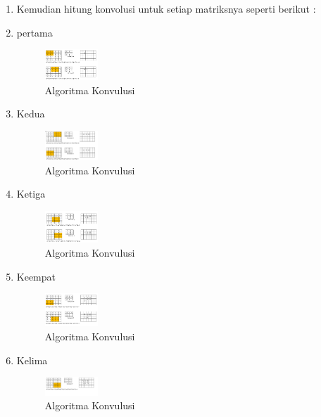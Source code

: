\begin{enumerate}
	\item Kemudian hitung konvolusi untuk setiap matriksnya seperti berikut :
	
	\item pertama
		\begin{figure}[ht]
			\centering
			\includegraphics[width=2cm]{figures/1174008/7/teori8.PNG}
			\caption{Algoritma Konvulusi}
			\label{Teori}
		\end{figure}

	\item Kedua
		\begin{figure}[ht]
			\centering
			\includegraphics[width=2cm]{figures/1174008/7/teori9.PNG}
			\caption{Algoritma Konvulusi}
			\label{Teori}
		\end{figure}

	\item Ketiga
		\begin{figure}[ht]
			\centering
			\includegraphics[width=2cm]{figures/1174008/7/teori10.PNG}
			\caption{Algoritma Konvulusi}
			\label{Teori}
		\end{figure}

	\item Keempat
		\begin{figure}[ht]
			\centering
			\includegraphics[width=2cm]{figures/1174008/7/teori11.PNG}
			\caption{Algoritma Konvulusi}
			\label{Teori}
		\end{figure}

	\item Kelima
		\begin{figure}[ht]
			\centering
			\includegraphics[width=2cm]{figures/1174008/7/teori12.PNG}
			\caption{Algoritma Konvulusi}
			\label{Teori}
		\end{figure}


\end{enumerate}

